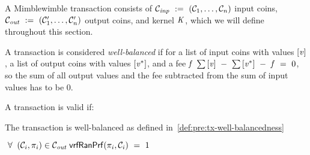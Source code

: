 A Mimblewimble transaction consists of $\mathcal{C}_{\mathit{inp}} ~:=~ (\mathcal{C}_1 , \dots , \mathcal{C}_n)$ input coins, $\mathcal{C}_{\mathit{out}} ~:=~ (\mathcal{C}'_1 , \dots , \mathcal{C}'_n)$ output coins, and kernel $\mathit{K}$, which we will define throughout this section.
\begin{definition}  \label{def:pre:tx-well-balancedness}
    A transaction is considered \emph{well-balanced} if for a list of input coins with values $[\mathit{v}]$, a list of output coins with values $[\mathit{v}^*]$, and a fee $\mathit{f}$ $\sum{[\mathit{v}]} ~-~ \sum{[\mathit{v}^*]} ~-~ \mathit{f} ~=~ 0$, so the sum of all output values and the fee subtracted from the sum of input values has to be 0.
\end{definition}

\begin{definition} \label{def:pre:tx-mw-validity}
    A transaction is valid if:
    \begin{asparaitem}
        \item The transaction is well-balanced as defined in~\cref{def:pre:tx-well-balancedness}
        \item $\;\forall\; \; (\mathcal{C}_i, \pi_i) \in \mathcal{C}_{\mathit{out}} \; \mathsf{vrfRanPrf}(\pi_i,\mathcal{C}_i) ~=~ 1$
    \end{asparaitem}
\end{definition}

